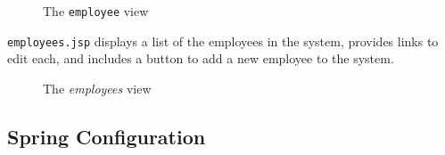 \documentclass{article}
\begin{document}
\vspace{10pt}
\begin{figure}[H]
\begin{center}
\end{center}
\caption{The \texttt{employee} view}
\label{fig:core/view-employee-1}
\end{figure}



\texttt{employees.jsp} displays a list of the employees in the system, provides links to edit each, and includes a button to add a new employee to the system.

\vspace{10pt}
\begin{figure}[H]
\begin{center}
\end{center}
\caption{The \emph{employees} view}
\label{fig:core/view-employees-1}
\end{figure}



\subsection{Spring Configuration}
\end{document}
